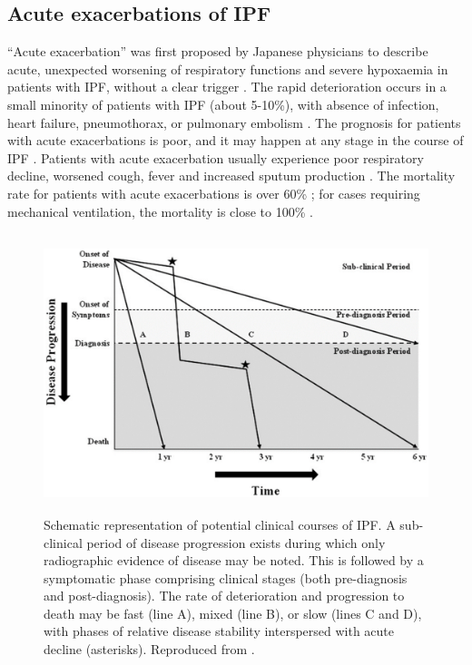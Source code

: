 \subsection{Acute exacerbations of IPF}
“Acute exacerbation” was first proposed by Japanese physicians to describe acute, unexpected worsening of respiratory functions and severe hypoxaemia in patients with IPF, without a clear trigger \citep{kondoh1993acute, gross1962concept}. The rapid deterioration occurs in a small minority of patients with IPF (about 5-10\%), with absence of infection, heart failure, pneumothorax, or pulmonary embolism \citep{azuma2005double,king2011idiopathic,raghu2011official}. The prognosis for patients with acute exacerbations is poor, and it may happen at any stage in the course of IPF \citep{kim2006acute,parambil2005histopathologic,sakamoto2009acute,kondoh2010prognostic}. Patients with acute exacerbation usually experience poor respiratory decline, worsened cough, fever and increased sputum production \citep{ambrosini2003acute,kim2006acute}. The mortality rate for patients with acute exacerbations is over 60\% \citep{wootton2011viral, lettieri2006prevalence}; for cases requiring mechanical ventilation, the mortality is close to 100\% \citep{king2011idiopathic,xaubet2017idiopathic}.

\begin{figure}[htbp]
  \centering 
  \includegraphics[height=3.2in]{Background/Image/IPFDiseaseProgression.png}
  \caption{Schematic representation of potential clinical courses of IPF.  A sub-clinical period of disease progression exists during which only radiographic evidence of disease may be noted. This is followed by a symptomatic phase comprising clinical stages (both pre-diagnosis and post-diagnosis). The rate of deterioration and progression to death may be fast (line A), mixed (line B), or slow (lines C and D), with phases of relative disease stability interspersed with acute decline (asterisks). Reproduced from \citep{ley2011clinical}.}
  \label{fig:IPFDiseaseProgression}
\end{figure}

